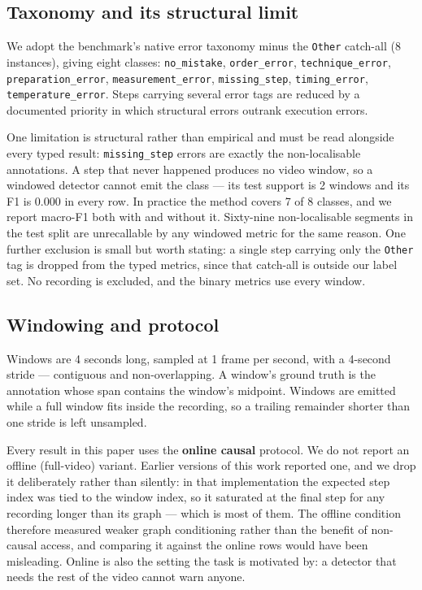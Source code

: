 \documentclass[10pt,twocolumn]{article}
\begin{document}
\subsection{Taxonomy and its structural limit}
We adopt the benchmark's native error taxonomy minus the \texttt{Other} catch-all
(8 instances), giving eight classes: \texttt{no\_mistake}, \texttt{order\_error},
\texttt{technique\_error}, \texttt{preparation\_error},
\texttt{measurement\_error}, \texttt{missing\_step}, \texttt{timing\_error},
\texttt{temperature\_error}. Steps carrying several error tags are reduced by a
documented priority in which structural errors outrank execution errors.

One limitation is structural rather than empirical and must be read alongside
every typed result: \texttt{missing\_step} errors are exactly the
non-localisable annotations. A step that never happened produces no video window,
so a windowed detector cannot emit the class --- its test support is 2 windows
and its F1 is 0.000 in every row. In practice the method covers 7 of 8 classes,
and we report macro-F1 both with and without it. Sixty-nine non-localisable
segments in the test split are unrecallable by any windowed metric for the same
reason. One further exclusion is small but worth stating: a single step carrying
only the \texttt{Other} tag is dropped from the typed metrics, since that
catch-all is outside our label set. No recording is excluded, and the binary
metrics use every window.

\subsection{Windowing and protocol}
Windows are 4 seconds long, sampled at 1 frame per second, with a 4-second
stride --- contiguous and non-overlapping. A window's ground truth is the
annotation whose span contains the window's midpoint. Windows are emitted while a
full window fits inside the recording, so a trailing remainder shorter than one
stride is left unsampled.

Every result in this paper uses the \textbf{online causal} protocol. We do not report
an offline (full-video) variant. Earlier versions of this work reported one, and
we drop it deliberately rather than silently: in that implementation the expected
step index was tied to the window index, so it saturated at the final step for
any recording longer than its graph --- which is most of them. The offline
condition therefore measured weaker graph conditioning rather than the benefit of
non-causal access, and comparing it against the online rows would have been
misleading. Online is also the setting the task is motivated by: a detector that
needs the rest of the video cannot warn anyone.
\end{document}
